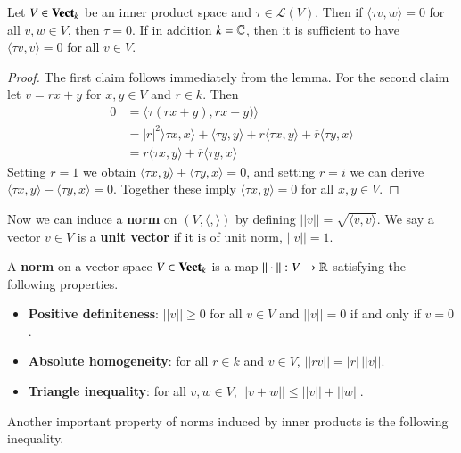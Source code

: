 \begin{theorem}
    Let $V \in \normalfont\textbf{Vect}_{k}$ be an inner product space and $\tau \in \mathcal{L}(V)$. Then if $\langle \tau v,w\rangle = 0$ for all $v,w \in V$, then $\tau = 0$. If in addition $k = \mathbb C$, then it is sufficient to have $\langle \tau v,v \rangle = 0$ for all $v \in V$.
\end{theorem}
\begin{proof}
    The first claim follows immediately from the lemma. For the second claim let $v = rx+y$ for $x,y \in V$ and $r \in k$. Then \begin{align*}
        0 &= \langle \tau(rx+y),rx+y)\rangle \\
        &= |r|^2\rangle \tau x,x\rangle + \langle \tau y,y\rangle + r\langle \tau x,y\rangle + \overline{r}\langle \tau y,x\rangle \\
        &= r\langle \tau x,y\rangle + \overline{r}\langle \tau y,x\rangle
    \end{align*}
    Setting $r = 1$ we obtain $\langle \tau x,y\rangle + \langle \tau y,x\rangle = 0$, and setting $r = i$ we can derive $\langle \tau x,y\rangle - \langle \tau y,x\rangle =0$. Together these imply $\langle \tau x,y\rangle =0$ for all $x,y \in V$.
\end{proof}

Now we can induce a \textbf{norm} on $(V,\langle ,\rangle)$ by defining $||v|| = \sqrt{\langle v,v\rangle}$. We say a vector $v \in V$ is a \textbf{unit vector} if it is of unit norm, $||v|| = 1$.

\begin{definition}
    A \textbf{norm} on a vector space $V \in \normalfont\textbf{Vect}_{k}$ is a map $||\cdot||:V\rightarrow \mathbb R$ satisfying the following properties. \begin{itemize}
        \item \textbf{Positive definiteness}: $||v|| \geq 0$ for all $v \in V$ and $||v|| = 0$ if and only if $v = 0$.
        \item \textbf{Absolute homogeneity}: for all $r \in k$ and $v \in V$, $||rv|| = |r|\,||v||$.
        \item \textbf{Triangle inequality}: for all $v,w \in V$, $||v+w|| \leq ||v||+||w||$.
    \end{itemize}
\end{definition}

Another important property of norms induced by inner products is the following inequality.

